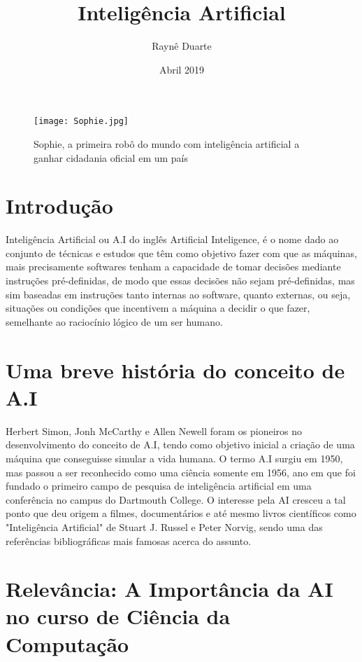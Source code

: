 \documentclass[10pt]{article}
\title{Inteligência Artificial}
\author{Raynê Duarte}
\date{Abril 2019}
\begin{document}
\begin{figure}

\centering

\texttt{[image: Sophie.jpg]}

\caption{Sophie, a primeira robô do mundo com inteligência artificial a ganhar cidadania oficial em um país}

\label{fig:Sophie.jpg}

\end{figure}

\maketitle

\newpage

\section*{Introdução}
Inteligência Artificial ou A.I do inglês Artificial Inteligence, é o nome dado ao conjunto de técnicas e estudos que têm como objetivo fazer com que as máquinas, mais precisamente softwares tenham a capacidade de tomar decisões mediante instruções pré-definidas, de modo que essas decisões não sejam pré-definidas, mas sim baseadas em instruções tanto internas ao software, quanto externas, ou seja, situações ou condições que incentivem a máquina a decidir o que fazer, semelhante ao raciocínio lógico de um ser humano.


\section*{Uma breve história do conceito de A.I}

Herbert Simon, Jonh McCarthy e Allen Newell foram os pioneiros no desenvolvimento do conceito de A.I, tendo como objetivo inicial a criação de uma máquina que conseguisse simular a vida humana. O termo A.I surgiu em 1950, mas passou a ser reconhecido como uma ciência somente em 1956, ano em que foi fundado o primeiro campo de pesquisa de inteligência artificial em uma conferência no campus do Dartmouth College. O interesse pela AI cresceu a tal ponto que deu origem a filmes, documentários e até mesmo livros científicos como "Inteligência Artificial" de \cite{r1}Stuart J. Russel e \cite{r2}Peter Norvig, sendo uma das referências bibliográficas mais famosas acerca do assunto. 


\section*{Relevância: A Importância da AI no curso de Ciência da Computação}
\end{document}
